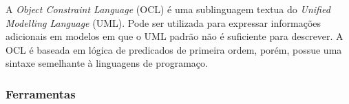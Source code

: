 A \textit{Object Constraint Language} (OCL) é uma sublinguagem textua do \textit{Unified Modelling Language} (UML).
Pode ser utilizada para expressar informações adicionais em modelos em que o UML padrão não é suficiente para
descrever. A OCL é baseada em lógica de predicados de primeira ordem, porém, possue uma sintaxe semelhante à
linguagens de programaço.

\subsubsection{Ferramentas}
\paragraph{}
\lipsum[1]
